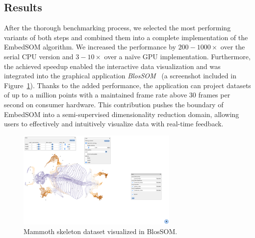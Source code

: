 \subsection{Results}

After the thorough benchmarking process, we selected the most performing variants of both steps and combined them into a complete implementation of the EmbedSOM algorithm. We increased the performance by $200-1000\times$ over the serial CPU version and $3-10\times$ over a na\"{i}ve GPU implementation. Furthermore, the achieved speedup enabled the interactive data visualization and was integrated into the graphical application \emph{BlosSOM}~\cite{molnarova2023throughput} (a screenshot included in Figure~\ref{fig:blossom}). Thanks to the added performance, the application can project datasets of up to a million points with a maintained frame rate above $30$ frames per second on consumer hardware. This contribution pushes the boundary of EmbedSOM into a semi-supervised dimensionality reduction domain, allowing users to effectively and intuitively visualize data with real-time feedback.

\begin{figure}
    \centering
    \includegraphics[width=0.7\textwidth]{img/blossom.png}
    \caption{Mammoth skeleton dataset visualized in BlosSOM.}
    \label{fig:blossom}
\end{figure}


